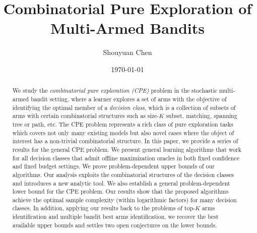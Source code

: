 \documentclass{article}
\title{Combinatorial Pure Exploration of \\ Multi-Armed Bandits}
\author{Shouyuan Chen}
\date{\today}
\newcommand{\wei}[1]{}
\newcommand{\wei}[1]{{\color{blue!50!black}  [\text{Wei:} #1]}}
\newcommand{\Problem}{{CPE}\xspace}
\begin{document}
\newpage

\maketitle
\vspace{-1em}
\begin{abstract}
We study the {\em combinatorial pure exploration (\Problem)} problem in the stochastic multi-armed bandit setting,
	where a learner explores a set of arms with the objective of identifying the optimal member
	of a \emph{decision class}, which is a collection of subsets of arms with certain combinatorial structures 
	such as size-$K$ subset, matching, spanning tree or path, etc.
The \Problem problem represents a rich class of pure exploration tasks which covers not only many existing models but also novel cases where the object of interest has a non-trivial combinatorial structure.
In this paper, we provide a series of results for the general \Problem problem.
We present general learning algorithms that work for all decision classes that admit offline maximization oracles in both fixed confidence and fixed budget settings. 
We prove problem-dependent upper bounds of our algorithms. 
Our analysis exploits the combinatorial structures of the decision classes and introduces a new analytic tool.
We also establish a general problem-dependent lower bound for the \Problem problem.
Our results show that the proposed algorithms achieve the optimal sample complexity (within logarithmic factors) for many decision classes. 
In addition, applying our results back to the problems of top-$K$ arms identification and multiple bandit best arms identification, we recover the best available upper bounds and settles two open conjectures on the lower bounds.



\end{abstract}
\end{document}
